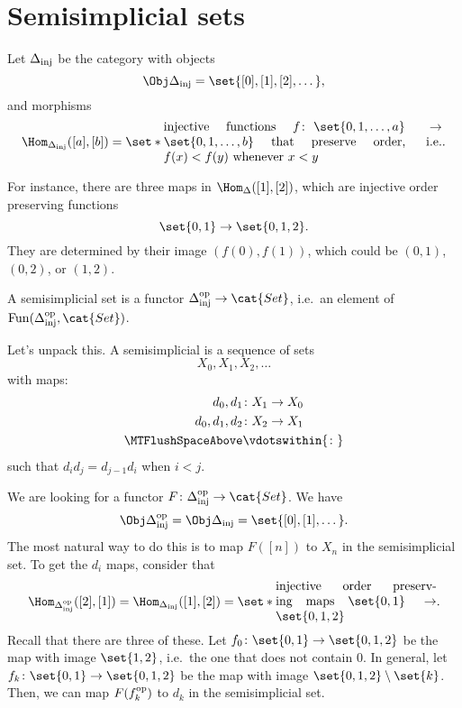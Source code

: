 \documentclass{standalone}
\begin{document}
\section{Semisimplicial sets}
\begin{definition}
  Let \(\Delta_{\mathrm{inj}}\) be the category with objects
  \[
    \Obj \Deltainj = \set{[0], [1], [2], \dots},
  \]
  and morphisms
  \[
    \Hom_{\Deltainj}([a], [b]) = \set*{
      \parbox{7.8cm}{
        injective functions
        \(f \colon \set{0, 1, \dots, a} \to \set{0, 1, \dots, b}\)
        that preserve order, i.e. \(f(x) < f(y)\) whenever \(x < y\)
      }
    }.
  \]
\end{definition}

For instance, there are three maps in \(\Hom_{\Delta}([1], [2])\), which are
injective order preserving functions
\[
  \set{0, 1} \to \set{0, 1, 2}.
\]
They are determined by their image \((f(0), f(1))\),
which could be \((0, 1)\), \((0, 2)\), or \((1, 2)\).

\begin{claim}
  A semisimplicial set is a functor \(\Deltainj^\op \to \cat{Set}\),
  i.e.\ an element of \(\Fun(\Deltainj^\op, \cat{Set})\).
\end{claim}

Let's unpack this. A semisimplicial is a sequence of sets
\[
  X_0, X_1, X_2, \dots
\]
with maps:
\begin{align*}
  d_0, d_1 &\colon X_1 \to X_0 \\
  d_0, d_1, d_2 &\colon X_2 \to X_1 \\
  \MTFlushSpaceAbove
  &\vdotswithin{\colon}
\end{align*}
such that \(d_i d_j = d_{j-1}d_i\) when \(i < j\).

We are looking for a functor \(F \colon \Deltainj^\op \to \cat{Set}\).
We have
\[
  \Obj \Deltainj^\op = \Obj \Deltainj = \set{[0], [1], \dots}.
\]
The most natural way to do this is to map \(F([n])\) to \(X_n\) in the
semisimplicial set. To get the \(d_i\) maps, consider that
\[
  \Hom_{\Deltainj^\op}([2], [1]) = \Hom_{\Deltainj}([1], [2])
     = \set*{\parbox{4.5cm}{
      injective order preserving maps \(\set{0, 1} \to \set{0, 1, 2}\)
     }}.
\]
Recall that there are three of these.
Let \(f_0 \colon \set{0, 1} \to \set{0, 1, 2}\) be the map with image
\(\set{1, 2}\), i.e.\ the one that does not contain \(0\).
In general, let \(f_k \colon \set{0, 1} \to \set{0, 1, 2}\) be the map with
image \(\set{0, 1, 2} \setminus \set{k}\).
Then, we can map \(F(f_k^{\textrm{op}})\) to \(d_k\) in the semisimplicial set.
\end{document}
